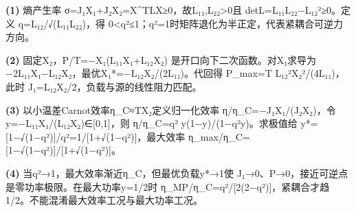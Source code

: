 \par\noindent\textbf{(1)} 熵产生率 σ=J₁X₁+J₂X₂=X\textasciicircum{}TLX≥0，故L₁₁,L₂₂>0且 detL=L₁₁L₂₂−L₁₂²≥0。定义 q=L₁₂/√(L₁₁L₂₂)，得 0<q²≤1；q²=1时矩阵退化为半正定，代表紧耦合可逆力方向。
\par\noindent\textbf{(2)} 固定X₂，P/T=−X₁(L₁₁X₁+L₁₂X₂) 是开口向下二次函数。对X₁求导为−2L₁₁X₁−L₁₂X₂，最优X₁*=−L₁₂X₂/(2L₁₁)。代回得 P\_max=T L₁₂²X₂²/(4L₁₁)，此时 J₁=L₁₂X₂/2，负载与源的线性阻力匹配。
\par\noindent\textbf{(3)} 以小温差Carnot效率η\_C≈TX₂定义归一化效率 η/η\_C=−J₁X₁/(J₂X₂)，令 y=−L₁₁X₁/(L₁₂X₂)∈[0,1]，则 η/η\_C=q² y(1−y)/(1−q²y)。求极值给 y*=[1−√(1−q²)]/q²=1/[1+√(1−q²)]，最大效率 η\_max/η\_C=[1−√(1−q²)]/[1+√(1−q²)]。
\par\noindent\textbf{(4)} 当q²→1，最大效率渐近η\_C，但最优负载y*→1使 J₁→0、P→0，接近可逆点是零功率极限。在最大功率y=1/2时 η\_MP/η\_C=q²/[2(2−q²)]，紧耦合才趋1/2。不能混淆最大效率工况与最大功率工况。
